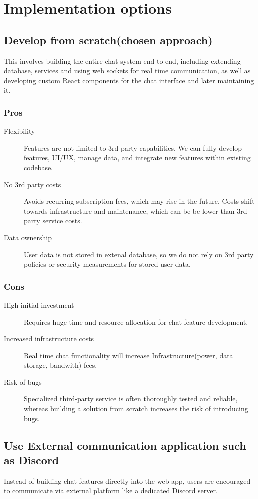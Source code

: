 \documentclass[]{VUMIFTemplateClass}
\begin{document}
\section{Implementation options}

\subsection{Develop from scratch(chosen approach)}
This involves building the entire chat system end-to-end, including extending database, services and using web sockets for real time communication, as well as developing custom  React components for the chat interface and later maintaining it.
\subsubsection{Pros}
\begin{description}
    \item[Flexibility] Features are not limited to 3rd party capabilities. We can fully develop features, UI/UX, manage data, and integrate new features within existing codebase.
    \item[No 3rd party costs] Avoids recurring subscription fees, which may rise in the future. Costs shift towards infrastructure and maintenance, which can be be lower than 3rd party service costs.
    \item[Data ownership] User data is not stored in extenal database, so we do not rely on 3rd party policies or security measurements for stored user data.
\end{description}
\subsubsection{Cons}
\begin{description}
    \item[High initial investment]  Requires huge time and resource allocation for chat feature development.
    \item[Increased infrastructure costs] Real time chat functionality will increase  Infrastructure(power, data storage, bandwith) fees.
    \item[Risk of bugs] Specialized third-party service is often thoroughly tested and reliable, whereas building a solution from scratch increases the risk of introducing bugs.
\end{description}

\subsection{Use External communication application such as Discord}
 Instead of building chat features directly into the web app, users are encouraged to communicate via  external platform like a dedicated Discord server. 
\end{document}
